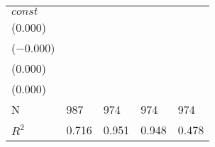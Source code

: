 \begin{tabular}{lllll}
$const$                    &    \makecell{$0.126^{***}$ \\ ($0.000$)} &   \makecell{$-0.003^{}$ \\ ($-0.000$)} &     \makecell{$0.025^{}$ \\ ($0.000$)} &     \makecell{$0.240^{***}$ \\ ($0.000$)} \\
\midrule N                 &                                      987 &                                    974 &                                    974 &                                       974 \\
$R^2$                      &                                    0.716 &                                  0.951 &                                  0.948 &                                     0.478 \\
\bottomrule
\end{tabular}
